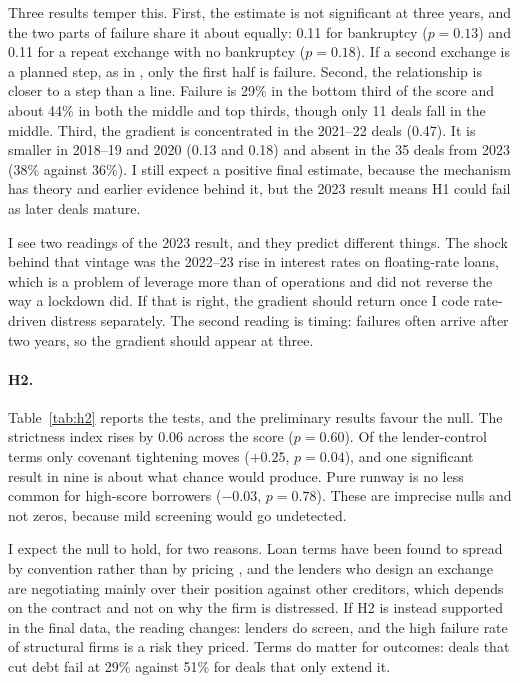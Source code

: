 \documentclass[12pt]{article}
\begin{document}




Three results temper this. First, the estimate is not significant at three years, and the two parts of failure share it about equally: 0.11 for bankruptcy ($p = 0.13$) and 0.11 for a repeat exchange with no bankruptcy ($p = 0.18$). If a second exchange is a planned step, as in \citet{kahl2002}, only the first half is failure. Second, the relationship is closer to a step than a line. Failure is 29\% in the bottom third of the score and about 44\% in both the middle and top thirds, though only 11 deals fall in the middle. Third, the gradient is concentrated in the 2021--22 deals (0.47). It is smaller in 2018--19 and 2020 (0.13 and 0.18) and absent in the 35 deals from 2023 (38\% against 36\%). I still expect a positive final estimate, because the mechanism has theory and earlier evidence behind it, but the 2023 result means H1 could fail as later deals mature.

I see two readings of the 2023 result, and they predict different things. The shock behind that vintage was the 2022--23 rise in interest rates on floating-rate loans, which is a problem of leverage more than of operations and did not reverse the way a lockdown did. If that is right, the gradient should return once I code rate-driven distress separately. The second reading is timing: failures often arrive after two years, so the gradient should appear at three.


\paragraph{H2.} Table~\ref{tab:h2} reports the tests, and the preliminary results favour the null. The strictness index rises by 0.06 across the score ($p = 0.60$). Of the lender-control terms only covenant tightening moves ($+0.25$, $p = 0.04$), and one significant result in nine is about what chance would produce. Pure runway is no less common for high-score borrowers ($-0.03$, $p = 0.78$). These are imprecise nulls and not zeros, because mild screening would go undetected.

I expect the null to hold, for two reasons. Loan terms have been found to spread by convention rather than by pricing \citep{badawi2024}, and the lenders who design an exchange are negotiating mainly over their position against other creditors, which depends on the contract and not on why the firm is distressed. If H2 is instead supported in the final data, the reading changes: lenders do screen, and the high failure rate of structural firms is a risk they priced. Terms do matter for outcomes: deals that cut debt fail at 29\% against 51\% for deals that only extend it.
\end{document}

